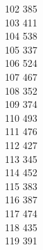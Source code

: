 { 102	385 \\
 103	411 \\
 104	538 \\
 105	337 \\
 106	524 \\
 107	467 \\
 108	352 \\
 109	374 \\
 110	493 \\
 111	476 \\
 112	427 \\
 113	345 \\
 114	452 \\
 115	383 \\
 116	387 \\
 117	474 \\
 118	435 \\
 119	391 \\
}
